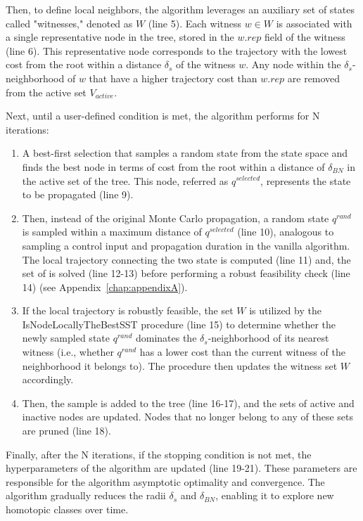 Then, to define local neighbors, the algorithm leverages an auxiliary set of states called "witnesses," denoted as $W$ (line 5). 
Each witness $w \in W$ is associated with a single representative node in the tree, stored in the $w.rep$ field of the witness (line 6).
This representative node corresponds to the trajectory with the lowest cost from the root within a distance $\delta_s$ of the witness $w$.
Any node within the $\delta_s$-neighborhood of $w$ that have a higher trajectory cost than $w.rep$ are removed from the active set $V_{active}$.

Next, until a user-defined condition is met, the algorithm performs for N iterations:
\begin{enumerate}
    \item A best-first selection that samples a random state from the state space and finds the best node in terms of cost from the root within a distance of $\delta_{BN}$ in the active set of the tree. 
    This node, referred as $q^{selected}$, represents the state to be propagated (line 9).
    \item Then, instead of the original Monte Carlo propagation, a random state $q^{rand}$ is sampled within a maximum distance of $q^{selected}$ (line 10), analogous to sampling a control input and propagation duration in the vanilla algorithm.
    The local trajectory connecting the two state is computed (line 11) and, the set of  is solved (line 12-13) before performing a robust feasibility check (line 14) (see Appendix~\ref{chap:appendixA}).
    \item If the local trajectory is robustly feasible, the set $W$ is utilized by the IsNodeLocallyTheBestSST procedure (line 15) to determine whether the newly sampled state $q^{rand}$ dominates the $\delta_s$-neighborhood of its nearest witness (i.e., whether $q^{rand}$ has a lower cost than the current witness of the neighborhood it belongs to). 
    The procedure then updates the witness set $W$ accordingly.
    \item Then, the sample is added to the tree (line 16-17), and the sets of active and inactive nodes are updated.
    Nodes that no longer belong to any of these sets are pruned (line 18).
\end{enumerate}

Finally, after the N iterations, if the stopping condition is not met, the hyperparameters of the algorithm are updated (line 19-21).
These parameters are responsible for the algorithm asymptotic optimality and convergence. 
The algorithm gradually reduces the radii $\delta_s$ and $\delta_{BN}$, enabling it to explore new homotopic classes over time.


